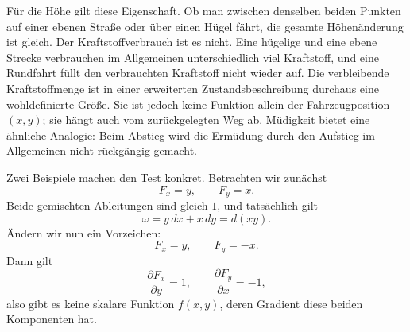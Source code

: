 Für die Höhe gilt diese Eigenschaft. Ob man zwischen denselben beiden Punkten auf einer ebenen Straße oder über einen Hügel fährt, die gesamte Höhenänderung ist gleich. Der Kraftstoffverbrauch ist es nicht. Eine hügelige und eine ebene Strecke verbrauchen im Allgemeinen unterschiedlich viel Kraftstoff, und eine Rundfahrt füllt den verbrauchten Kraftstoff nicht wieder auf. Die verbleibende Kraftstoffmenge ist in einer erweiterten Zustandsbeschreibung durchaus eine wohldefinierte Größe. Sie ist jedoch keine Funktion allein der Fahrzeugposition \((x,y)\); sie hängt auch vom zurückgelegten Weg ab. Müdigkeit bietet eine ähnliche Analogie: Beim Abstieg wird die Ermüdung durch den Aufstieg im Allgemeinen nicht rückgängig gemacht.

\begin{classroomqa}
\end{classroomqa}

Zwei Beispiele machen den Test konkret. Betrachten wir zunächst
\begin{equation}
 F_x=y,\qquad F_y=x.
 \label{eq:sm6-exact-example}
\end{equation}
Beide gemischten Ableitungen sind gleich \(1\), und tatsächlich gilt
\begin{equation}
 \omega=y\,dx+x\,dy=d(xy).
 \label{eq:sm6-exact-example-potential}
\end{equation}
Ändern wir nun ein Vorzeichen:
\begin{equation}
 F_x=y,\qquad F_y=-x.
 \label{eq:sm6-inexact-example}
\end{equation}
Dann gilt
\begin{equation}
 \frac{\partial F_x}{\partial y}=1,
 \qquad
 \frac{\partial F_y}{\partial x}=-1,
 \label{eq:sm6-inexact-cross-derivatives}
\end{equation}
also gibt es keine skalare Funktion \(f(x,y)\), deren Gradient diese beiden Komponenten hat.

